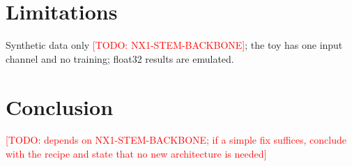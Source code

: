 \documentclass{article}
\newcommand{\todo}[1]{\textcolor{red}{[TODO: #1]}}
\begin{document}
\section{Limitations}
Synthetic data only \todo{NX1-STEM-BACKBONE}; the toy has one input channel and no training; float32 results are emulated.

\section{Conclusion}
\todo{depends on NX1-STEM-BACKBONE; if a simple fix suffices, conclude with the recipe and state that no new architecture is needed}
\end{document}
